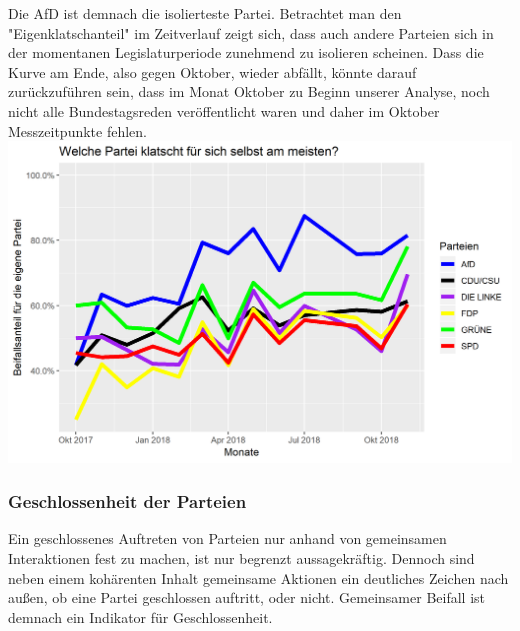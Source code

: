 Die AfD ist demnach die isolierteste Partei. Betrachtet man den "Eigenklatschanteil" im Zeitverlauf zeigt sich, dass auch andere Parteien sich in der momentanen Legislaturperiode zunehmend zu isolieren scheinen. Dass die Kurve am Ende, also gegen Oktober, wieder abfällt, könnte darauf zurückzuführen sein, dass im Monat Oktober zu Beginn unserer Analyse, noch nicht alle Bundestagsreden veröffentlicht waren und daher im Oktober Messzeitpunkte fehlen. \\
  
\includegraphics[width=\linewidth]{Grafiken/13_17Zeitverlauf_Klatschen.png}\\

\subsubsection{Geschlossenheit der Parteien}
Ein geschlossenes Auftreten von Parteien nur anhand von gemeinsamen Interaktionen fest zu machen, ist nur begrenzt aussagekräftig. Dennoch sind neben einem kohärenten Inhalt gemeinsame Aktionen ein deutliches Zeichen nach außen, ob eine Partei geschlossen auftritt, oder nicht. Gemeinsamer Beifall ist demnach ein Indikator für Geschlossenheit. \\

